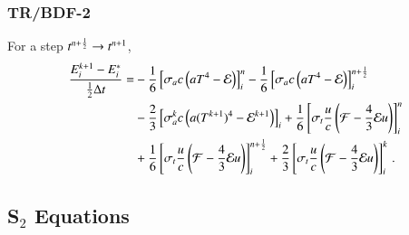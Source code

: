 \documentclass[preprint,12pt]{elsarticle}
\begin{document}
\subsubsection{TR/BDF-2}
For a step $t^{n+\frac{1}{2}}\rightarrow t^{n+1}$,
\begin{equation}\begin{split}
  \frac{E_i^{k+1}-E_i^*}{\half\dt} = &
  -\sixth\left[\sigma_a c\left(aT^4 - \E\right)\right]_i^n
  -\sixth\left[\sigma_a c\left(aT^4 - \E\right)\right]_i^{n+\half}\\
  &-\frac{2}{3}\left[\sigma_a^k c\left(a(T^{k+1})^4 - \E^{k+1}\right)\right]_i
   +\sixth\left[\sigma_t\frac{u}{c}\left(\F-\frac{4}{3}\E u\right)\right]_i^n\\
  &+\sixth\left[\sigma_t\frac{u}{c}\left(\F-\frac{4}{3}\E u\right)\right]_i^{n+\half}
   +\frac{2}{3}\left[\sigma_t\frac{u}{c}\left(\F-\frac{4}{3}\E u\right)\right]_i^k
  \pep
\lequ{hydroEBDF2full}
\end{split}\end{equation}

\subsection{\texorpdfstring{S$_2$}{S-2} Equations}
\end{document}
